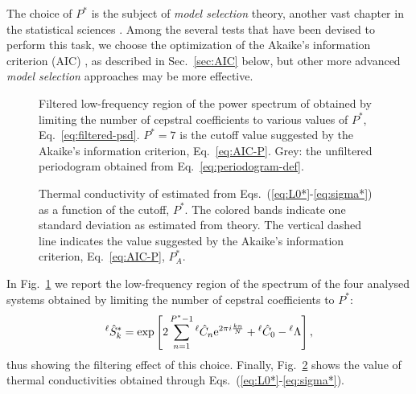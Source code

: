 The choice of $P^*$ is the subject of \emph{model selection} theory, another vast chapter in the statistical sciences \cite{Claeskens2008}. Among the several tests that have been devised to perform this task, we choose the optimization of the Akaike's information criterion (AIC) \cite{Claeskens2008,Akaike1974}, as described in Sec.~\ref{sec:AIC} below, but other more advanced \emph{model selection} approaches \citep{Claeskens2008} may be more effective.

\begin{figure}[!tb]
    \centering
    \caption{
    Filtered low-frequency region of the power spectrum of \LEnote{******} obtained by limiting the number of cepstral coefficients to various values of $P^*$, Eq.~\eqref{eq:filtered-psd}. $P^*=7$ is the cutoff value suggested by the Akaike's information criterion, Eq.~\eqref{eq:AIC-P}. Grey: the unfiltered periodogram obtained from Eq.~\eqref{eq:periodogram-def}.
    }  \label{fig:filtered-psds}
\end{figure}
\begin{figure}[!tb]
    \centering
    \caption{
    Thermal conductivity of \LEnote{******} estimated from Eqs.~(\ref{eq:L0*}-\ref{eq:sigma*}) as a function of the cutoff, $P^*$. The colored bands indicate one standard deviation as estimated from theory. The vertical dashed line indicates the value suggested by the Akaike's information criterion, Eq.~\eqref{eq:AIC-P}, $P_A^*$.
    }  \label{fig:kappa-convergence-Pstar}
\end{figure}

In Fig.~\ref{fig:filtered-psds} we report the low-frequency region of the spectrum of the four analysed systems obtained by limiting the number of cepstral coefficients to $P^*$:
\begin{equation}
    ^\ell\hat{S}_k^* = \exp\left[ 2\sum_{n=1}^{P^*-1} {}^\ell\hat{C}_n \mathrm{e}^{2\pi i \frac{k n}{N}} + {}^\ell\hat{C}_0 - {}^\ell\rLambda\right], \label{eq:filtered-psd}
\end{equation}
thus showing the filtering effect of this choice.
Finally, Fig.~\ref{fig:kappa-convergence-Pstar} shows the value of thermal conductivities obtained through Eqs.~(\ref{eq:L0*}-\ref{eq:sigma*}).


